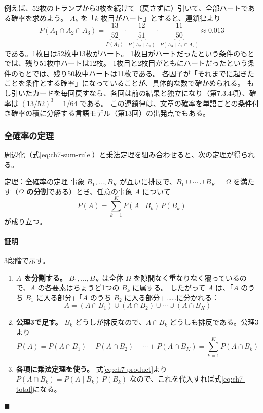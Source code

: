 例えば、52枚のトランプから3枚を続けて（戻さずに）引いて、全部ハートである確率を求めよう。
$A_k$ を「$k$ 枚目がハート」とすると、連鎖律より
\begin{equation*}
  P(A_1 \cap A_2 \cap A_3) = \underbrace{\frac{13}{52}}_{P(A_1)} \cdot \underbrace{\frac{12}{51}}_{P(A_2 \mid A_1)} \cdot \underbrace{\frac{11}{50}}_{P(A_3 \mid A_1 \cap A_2)} \approx 0.013
\end{equation*}
である。1枚目は52枚中13枚がハート。
1枚目がハートだったという条件のもとでは、残り51枚中ハートは12枚。
1枚目と2枚目がともにハートだったという条件のもとでは、残り50枚中ハートは11枚である。
各因子が「それまでに起きたことを条件とする確率」になっていることが、具体的な数で確かめられる。
もし引いたカードを毎回戻すなら、各回は前の結果と独立になり（第7.3.4項）、確率は $(13/52)^3 = 1/64$ である。
この連鎖律は、文章の確率を単語ごとの条件付き確率の積に分解する言語モデル（第13回）の出発点でもある。

\subsubsection{全確率の定理}

周辺化（式\eqref{eq:ch7-sum-rule}）と乗法定理を組み合わせると、次の定理が得られる。

\begin{itembox}[l]{定理：全確率の定理}
事象 $B_1, \ldots, B_K$ が互いに排反で、$B_1 \cup \cdots \cup B_K = \Omega$ を満たす（\textbf{$\Omega$ の分割}である）とき、任意の事象 $A$ について
\begin{equation}
  P(A) = \sum_{k=1}^{K} P(A \mid B_k)\,P(B_k)
  \label{eq:ch7-total}
\end{equation}
が成り立つ。
\end{itembox}

\paragraph{証明}
3段階で示す。
\begin{enumerate}
  \item \textbf{$A$ を分割する。}
    $B_1, \ldots, B_K$ は全体 $\Omega$ を隙間なく重なりなく覆っているので、$A$ の各要素はちょうど1つの $B_k$ に属する。
    したがって $A$ は、「$A$ のうち $B_1$ に入る部分」「$A$ のうち $B_2$ に入る部分」……に分かれる：
    \begin{equation*}
      A = (A \cap B_1) \cup (A \cap B_2) \cup \cdots \cup (A \cap B_K)
    \end{equation*}
  \item \textbf{公理3で足す。}
    $B_k$ どうしが排反なので、$A \cap B_k$ どうしも排反である。公理3より
    \begin{equation*}
      P(A) = P(A \cap B_1) + P(A \cap B_2) + \cdots + P(A \cap B_K) = \sum_{k=1}^K P(A \cap B_k)
    \end{equation*}
  \item \textbf{各項に乗法定理を使う。}
    式\eqref{eq:ch7-product}より $P(A \cap B_k) = P(A \mid B_k)\,P(B_k)$ なので、これを代入すれば式\eqref{eq:ch7-total}になる。
\end{enumerate}
\hfill $\blacksquare$

